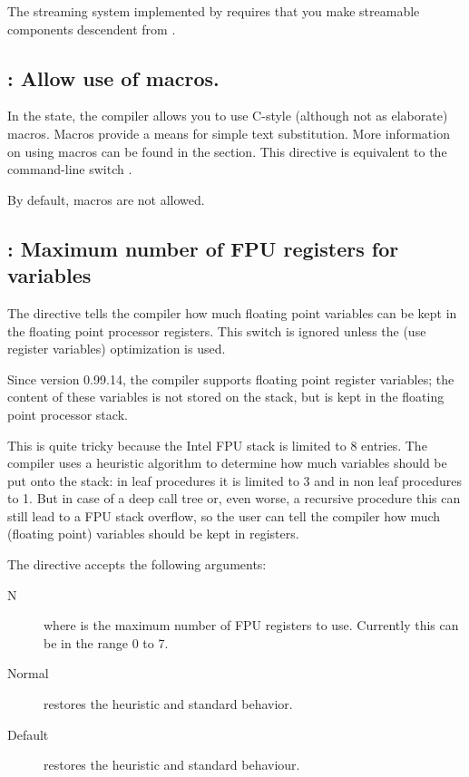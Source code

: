 \begin{remark}The streaming system implemented by \fpc requires that you make
streamable components descendent from .
\end{remark}

\subsection{ : Allow use of macros.}

In the  state, the compiler allows you to use C-style
(although not as elaborate) macros. Macros provide a means for simple text
substitution. More information on using macros can be found in the
 section. This directive is equivalent to the command-line
switch .

By default, macros are not allowed.

\subsection{ : Maximum number of FPU registers for variables}

The  directive tells the compiler how much floating point
variables can be kept in the floating point processor registers. This switch is ignored
unless the  (use register variables) optimization is used.

Since version 0.99.14, the \fpc compiler supports floating point register variables;
the content of these variables is not stored on the stack, but is kept in the
floating point processor stack.

This is quite tricky because the Intel FPU stack is limited to 8 entries.
The compiler uses a heuristic algorithm to determine how much variables should be
put onto the stack: in leaf procedures it is limited to 3 and in non leaf
procedures to 1. But in case of a deep call tree or, even worse, a recursive
procedure this can still lead to a FPU stack overflow, so the user can tell
the compiler how much (floating point) variables should be kept in registers.

The directive accepts the following arguments:

\begin{description}
\item [N] where  is the maximum number of FPU registers to use.
Currently this can be in the range 0 to 7.
\item[Normal] restores the heuristic and standard behavior.
\item[Default] restores the heuristic and standard behaviour.
\end{description}

